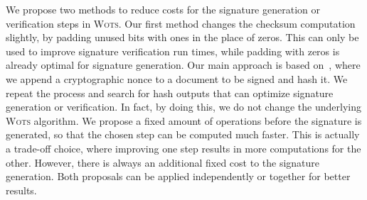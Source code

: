 \documentclass[12pt]{article}
\newcommand{\wots}{\textsc{Wots}}
\begin{document}
We propose two methods to reduce costs for the signature generation or
verification steps in \wots{}. Our first method changes the checksum
computation slightly, by padding unused bits with ones in the place of zeros.
This can only be used to improve signature verification run times, while
padding with zeros is already optimal for signature generation. Our main
approach is based on~\cite{Steinwandt:article:2008:oct}, where we append a
cryptographic nonce to a document to be signed and hash it. We repeat the
process and search for hash outputs that can optimize signature generation or
verification. In fact, by doing this, we do not change the underlying
\wots{} algorithm.  We propose a fixed amount of operations before the
signature is generated, so that the chosen step can be computed much faster.
This is actually a trade-off choice, where improving one step results in more
computations for the other. However, there is always an additional fixed cost
to the signature generation. Both proposals can be applied independently or
together for better results.


{\footnotesize
}
\end{document}
